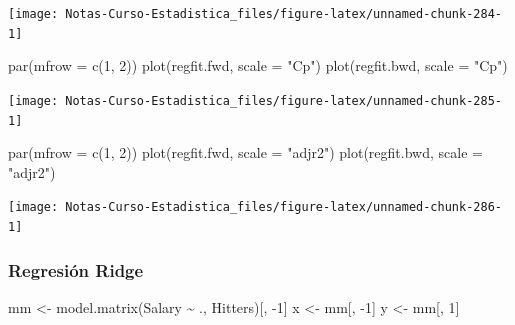 \documentclass[
  12pt,
]{book}
\newenvironment{Shaded}{\begin{snugshade}}{\end{snugshade}}
\newcommand{\AttributeTok}[1]{\textcolor[rgb]{0.77,0.63,0.00}{#1}}
\newcommand{\DecValTok}[1]{\textcolor[rgb]{0.00,0.00,0.81}{#1}}
\newcommand{\FunctionTok}[1]{\textcolor[rgb]{0.00,0.00,0.00}{#1}}
\newcommand{\NormalTok}[1]{#1}
\newcommand{\OtherTok}[1]{\textcolor[rgb]{0.56,0.35,0.01}{#1}}
\newcommand{\SpecialCharTok}[1]{\textcolor[rgb]{0.00,0.00,0.00}{#1}}
\newcommand{\StringTok}[1]{\textcolor[rgb]{0.31,0.60,0.02}{#1}}
\theoremstyle{definition}
\theoremstyle{definition}
\theoremstyle{definition}
\theoremstyle{remark}
\begin{document}
\begin{center}\texttt{[image: Notas-Curso-Estadistica\_files/figure-latex/unnamed-chunk-284-1]} \end{center}

\begin{Shaded}
\begin{Highlighting}[]
\FunctionTok{par}\NormalTok{(}\AttributeTok{mfrow =} \FunctionTok{c}\NormalTok{(}\DecValTok{1}\NormalTok{, }\DecValTok{2}\NormalTok{))}
\FunctionTok{plot}\NormalTok{(regfit.fwd, }\AttributeTok{scale =} \StringTok{"Cp"}\NormalTok{)}
\FunctionTok{plot}\NormalTok{(regfit.bwd, }\AttributeTok{scale =} \StringTok{"Cp"}\NormalTok{)}
\end{Highlighting}
\end{Shaded}

\begin{center}\texttt{[image: Notas-Curso-Estadistica\_files/figure-latex/unnamed-chunk-285-1]} \end{center}

\begin{Shaded}
\begin{Highlighting}[]
\FunctionTok{par}\NormalTok{(}\AttributeTok{mfrow =} \FunctionTok{c}\NormalTok{(}\DecValTok{1}\NormalTok{, }\DecValTok{2}\NormalTok{))}
\FunctionTok{plot}\NormalTok{(regfit.fwd, }\AttributeTok{scale =} \StringTok{"adjr2"}\NormalTok{)}
\FunctionTok{plot}\NormalTok{(regfit.bwd, }\AttributeTok{scale =} \StringTok{"adjr2"}\NormalTok{)}
\end{Highlighting}
\end{Shaded}

\begin{center}\texttt{[image: Notas-Curso-Estadistica\_files/figure-latex/unnamed-chunk-286-1]} \end{center}

\hypertarget{regresiuxf3n-ridge-1}{%
\subsubsection{Regresión Ridge}\label{regresiuxf3n-ridge-1}}

\begin{Shaded}
\begin{Highlighting}[]
\NormalTok{mm }\OtherTok{\textless{}{-}} \FunctionTok{model.matrix}\NormalTok{(Salary }\SpecialCharTok{\textasciitilde{}}\NormalTok{ ., Hitters)[, }\SpecialCharTok{{-}}\DecValTok{1}\NormalTok{]}
\NormalTok{x }\OtherTok{\textless{}{-}}\NormalTok{ mm[, }\SpecialCharTok{{-}}\DecValTok{1}\NormalTok{]}
\NormalTok{y }\OtherTok{\textless{}{-}}\NormalTok{ mm[, }\DecValTok{1}\NormalTok{]}
\end{Highlighting}
\end{Shaded}
\end{document}

